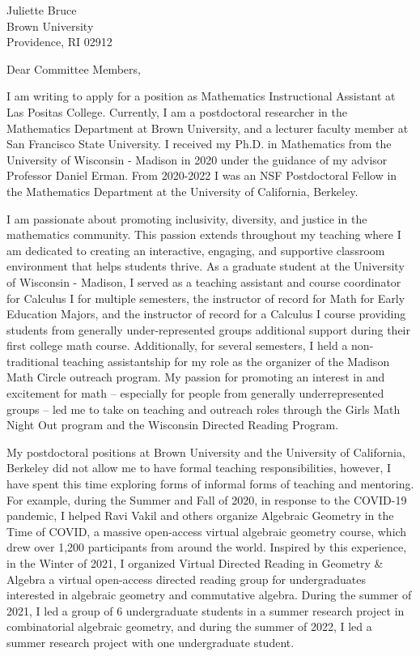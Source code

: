 \documentclass[11pt]{brownletter}
\date{October 14, 2023} %
\begin{document}
\begin{letter}{Juliette Bruce\\ 
               Brown University\\ 
               Providence, RI 02912}

\opening{Dear Committee Members,}

I am writing to apply for a position as Mathematics Instructional Assistant at Las Positas College. Currently, I am a postdoctoral researcher in the Mathematics Department at Brown University, and a lecturer faculty member at San Francisco State University. I received my Ph.D. in Mathematics from the University of Wisconsin - Madison in 2020 under the guidance of my advisor Professor Daniel Erman. From 2020-2022 I was an NSF Postdoctoral Fellow in the Mathematics Department at the University of California, Berkeley.

I am passionate about promoting inclusivity, diversity, and justice in the mathematics community. This passion extends throughout my teaching where I am dedicated to creating an interactive, engaging, and supportive classroom environment that helps students thrive. As a graduate student at the University of Wisconsin - Madison, I served as a teaching assistant and course coordinator for Calculus I for multiple semesters, the instructor of record for Math for Early Education Majors, and the instructor of record for a Calculus I course providing students from generally under-represented groups additional support during their first college math course. Additionally, for several semesters, I held a non-traditional teaching assistantship for my role as the organizer of the Madison Math Circle outreach program. My passion for promoting an interest in and excitement for math – especially for people from generally underrepresented groups – led me to take on teaching and outreach roles through the Girls Math Night Out program and the Wisconsin Directed Reading Program.

My postdoctoral positions at Brown University and the University of California, Berkeley did not allow me to have formal teaching responsibilities, however, I have spent this time exploring forms of informal forms of teaching and mentoring. For example, during the Summer and Fall of 2020, in response to the COVID-19 pandemic, I helped Ravi Vakil and others organize Algebraic Geometry in the Time of COVID, a massive open-access virtual algebraic geometry course, which drew over 1,200 participants from around the world. Inspired by this experience, in the Winter of 2021, I organized Virtual Directed Reading in Geometry \& Algebra a virtual open-access directed reading group for undergraduates interested in algebraic geometry and commutative algebra. During the summer of 2021, I led a group of 6 undergraduate students in a summer research project in combinatorial algebraic geometry, and during the summer of 2022, I led a summer research project with one undergraduate student.


\end{letter}
\end{document}
